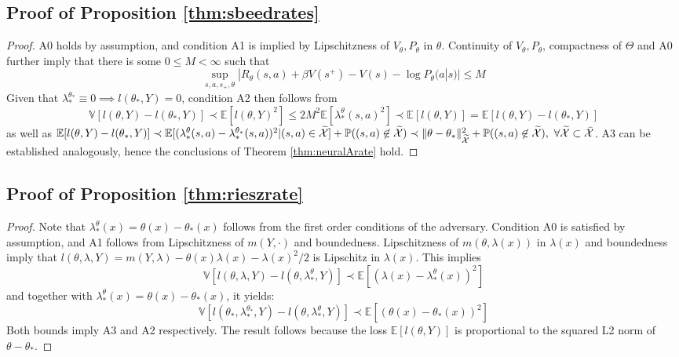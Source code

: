 \documentclass[12pt]{article}
\theoremstyle{myplain}
\theoremstyle{definition}
\theoremstyle{definition}
\theoremstyle{remark}
\numberwithin{equation}{section}
\begin{document}
\subsection{Proof of Proposition \ref{thm:sbeedrates}}
\begin{proof}
A0 holds by assumption, and condition A1 is implied by Lipschitzness of $V_\theta, P_\theta$ in $\theta$. Continuity of $V_\theta, P_\theta$, compactness of $\Theta$ and A0 further imply that there is some $0\leq M<\infty$ such that $$\sup_{s,a,s_+,\theta}|R_\theta(s,a)+\beta V(s^+)-V(s)-\log P_\theta(a|s)|\leq M$$ Given that $\lambda_*^{\theta_*}\equiv 0\implies l(\theta_*, Y)=0$, condition A2 then follows from $$\mathbb{V}[l(\theta, Y)-l(\theta_*, Y)]\prec \mathbb{E}[l(\theta, Y)^2]\leq 2 M^2\mathbb{E}[\lambda_*^\theta(s,a)^2]\prec \mathbb{E}[l(\theta, Y)]=\mathbb{E}[l(\theta, Y)-l(\theta_*, Y)]$$
as well as $\mathbb{E}[l(\theta, Y)-l(\theta_*, Y)]\prec\mathbb{E}[(\lambda_*^\theta(s,a)-\lambda_*^{\theta_*}(s,a))^2|(s,a)\in\widetilde{\mathcal{X}}]+\mathbb{P}((s,a)\not\in\widetilde{\mathcal{X}})\prec\|\theta-\theta_*\|^2_{\widetilde{\mathcal{X}}}+\mathbb{P}((s,a)\not\in\widetilde{\mathcal{X}}), \ \forall\widetilde{\mathcal{X}}\subset\Bar{\mathcal{X}}$. A3 can be established analogously, hence the conclusions of Theorem \ref{thm:neuralArate} hold.
\end{proof}
\subsection{Proof of Proposition \ref{thm:rieszrate}}
\begin{proof}
Note that $\lambda_*^\theta(x)=\theta(x)-\theta_*(x)$ follows from the first order conditions of the adversary. Condition A0 is satisfied by assumption, and A1 follows from Lipschitzness of $m(Y,\cdot)$ and boundedness. Lipschitzness of $m(\theta,\lambda(x))$ in $\lambda(x)$ and boundedness imply that $l(\theta,\lambda,Y)=m(Y,\lambda)-\theta(x)\lambda(x)-\lambda(x)^2/2$ is Lipschitz in $\lambda(x)$. This implies
$$\mathbb{V}[l(\theta,\lambda,Y)-l(\theta,\lambda_*^\theta,Y)]\prec \mathbb{E}[(\lambda(x)-\lambda_*^\theta(x))^2]$$
and together with $\lambda_*^\theta(x)=\theta(x)-\theta_*(x)$, it yields:
$$\mathbb{V}[l(\theta_*,\lambda_*^{\theta_*},Y)-l(\theta,\lambda_*^\theta,Y)]\prec \mathbb{E}[(\theta(x)-\theta_*(x))^2]$$
Both bounds imply A3 and A2 respectively. The result follows because the loss $\mathbb{E}[l(\theta,Y)]$ is proportional to the squared L2 norm of $\theta-\theta_*$.
\end{proof}
\end{document}
